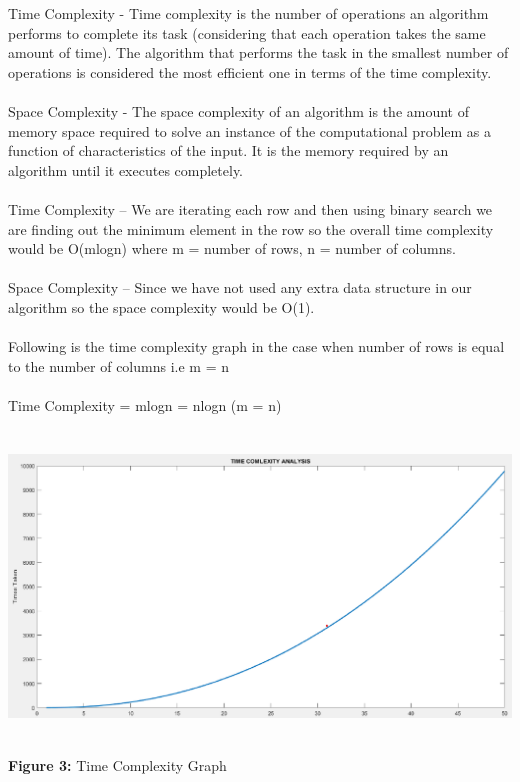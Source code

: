 \documentclass[10pt]{article}
\begin{document}
\begin{multicols*}{2}
Time Complexity - Time complexity is the number of operations an algorithm performs to complete its task (considering that each operation takes the same amount of time). The algorithm that performs the task in the smallest number of operations is considered the most efficient one in terms of the time complexity.\\\\Space Complexity - The space complexity of an algorithm is the amount of memory space required to solve an instance of the computational problem as a function of characteristics of the input. It is the memory required by an algorithm until it executes completely.\\\\Time Complexity – We are iterating each row and then using binary search we are finding out the minimum element in the row so the overall time complexity would be O(mlogn) where m = number of rows, n = number of columns.\\\\Space Complexity – Since we have not used any extra data structure in our algorithm so the space complexity would be O(1).\\\\
Following is the time complexity graph in the case when number of rows is equal to the number of columns i.e m = n\\\\Time Complexity = mlogn = nlogn (m = n)\\\\
\includegraphics[width=\columnwidth, height=8cm]{Time Complexity.png}\begin{center}\textbf{Figure 3:} Time Complexity Graph\end{center}

\end{multicols*}
\end{document}
